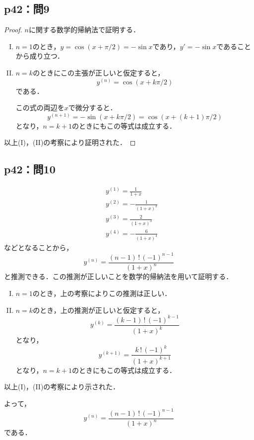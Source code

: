 \documentclass[uplatex,dvipdfmx,a4paper,10pt,fleqn]{jsarticle}
\newenvironment{tleftbar}{\begin{tbleftline}\setlength{\parindent}{1zw}}{\end{tbleftline}}
\begin{document}
    


\subsection*{p42：問9}

\begin{tleftbar}
    \begin{proof}
        $n$に関する数学的帰納法で証明する．
        \begin{enumerate}[(I)]
            \item $n=1$のとき，$y= \cos (x +\pi /2)= -\sin x$であり，$y' = -\sin x$であることから成り立つ．
            \item $n=k$のときにこの主張が正しいと仮定すると，
            \[
                y^{(n)} = \cos ( x + k \pi /2)
            \]
            である．

            この式の両辺を$x$で微分すると．
            \[
                y^{(n+1)} = -\sin (x+ k \pi/2)= \cos (x+ (k+1)\pi/2)
            \]
            となり，$n =k+1$のときにもこの等式は成立する．
        \end{enumerate}
            以上(I)，(II)の考察により証明された．
    \end{proof}
\end{tleftbar}


\subsection*{p42：問10}

\begin{tleftbar}
    \begin{align*} 
        & y^{(1)}= \frac{1}{1+x} \\
        & y^{(2)}=-\frac{1}{(1+x)^2} \\
        & y^{(3)}=\frac{2}{(1+x)^3} \\
        & y^{(4)}= -\frac{6}{(1+x)^4}
    \end{align*} 
    などとなることから，
    \[
        y^{(n)} = \frac{(n-1)\,!\, (-1)^{n-1}}{(1+x)^n}
    \]
    と推測できる．この推測が正しいことを数学的帰納法を用いて証明する．
    \begin{enumerate}[(I)]
       \item  $n=1$のとき，上の考察によりこの推測は正しい．
       \item $n=k$のとき，上の推測が正しいと仮定すると，
       \[
        y^{(k)} = \frac{(k-1)\,!\,(-1)^{k-1}}{(1+x)^k}
       \]
       となり，
       \[
        y^{(k+1)}  = \frac{k\,!\, (-1)^{k}}{(1+x)^{k+1}}
        \] 
        となり，$n=k+1$のときにもこの等式は成立する．
    \end{enumerate}
    以上(I)，(II)の考察により示された．

    よって，
    \[
        y^{(n)} = \frac{(n-1)\,!\, (-1)^{n-1}}{(1+x)^n}
    \]
    である．
\end{tleftbar}
\end{document}
